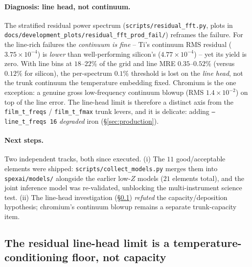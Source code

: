 \documentclass[11pt,a4paper]{article}
\newcommand{\code}[1]{\texttt{#1}}
\begin{document}
\paragraph{Diagnosis: line head, not continuum.} The stratified residual
power spectrum (\code{scripts/residual\_fft.py}, plots in
\code{docs/development\_plots/residual\_fft\_prod\_fail/}) reframes the
failure. For the line-rich failures the \emph{continuum is fine} -- Ti's
continuum RMS residual ($3.75\times10^{-4}$) is \emph{lower} than
well-performing silicon's ($4.77\times10^{-4}$) -- yet its yield is zero.
With line bins at $18$--$22\%$ of the grid and line MRE $0.35$--$0.52\%$
(versus $0.12\%$ for silicon), the per-spectrum $0.1\%$ threshold is lost on
the \emph{line head}, not the trunk continuum the temperature embedding
fixed. Chromium is the one exception: a genuine gross low-frequency
continuum blowup (RMS $1.4\times10^{-2}$) on top of the line error. The
line-head limit is therefore a distinct axis from the \code{film\_t\_freqs}
/ \code{film\_t\_fmax} trunk levers, and it is delicate: adding
\code{--line\_t\_freqs 16} \emph{degraded} iron (\S\ref{sec:production}).

\paragraph{Next steps.} Two independent tracks, both since executed. (i) The
$11$ good/acceptable elements were shipped: \code{scripts/collect\_models.py}
merges them into \code{spexai/models/} alongside the earlier low-$Z$ models
($21$ elements total), and the joint inference model was re-validated,
unblocking the multi-instrument science test. (ii) The line-head investigation
(\S\ref{sec:linehead_floor}) \emph{refuted} the capacity/deposition hypothesis;
chromium's continuum blowup remains a separate trunk-capacity item.

\subsection{The residual line-head limit is a temperature-conditioning floor,
not capacity}
\label{sec:linehead_floor}
\end{document}
